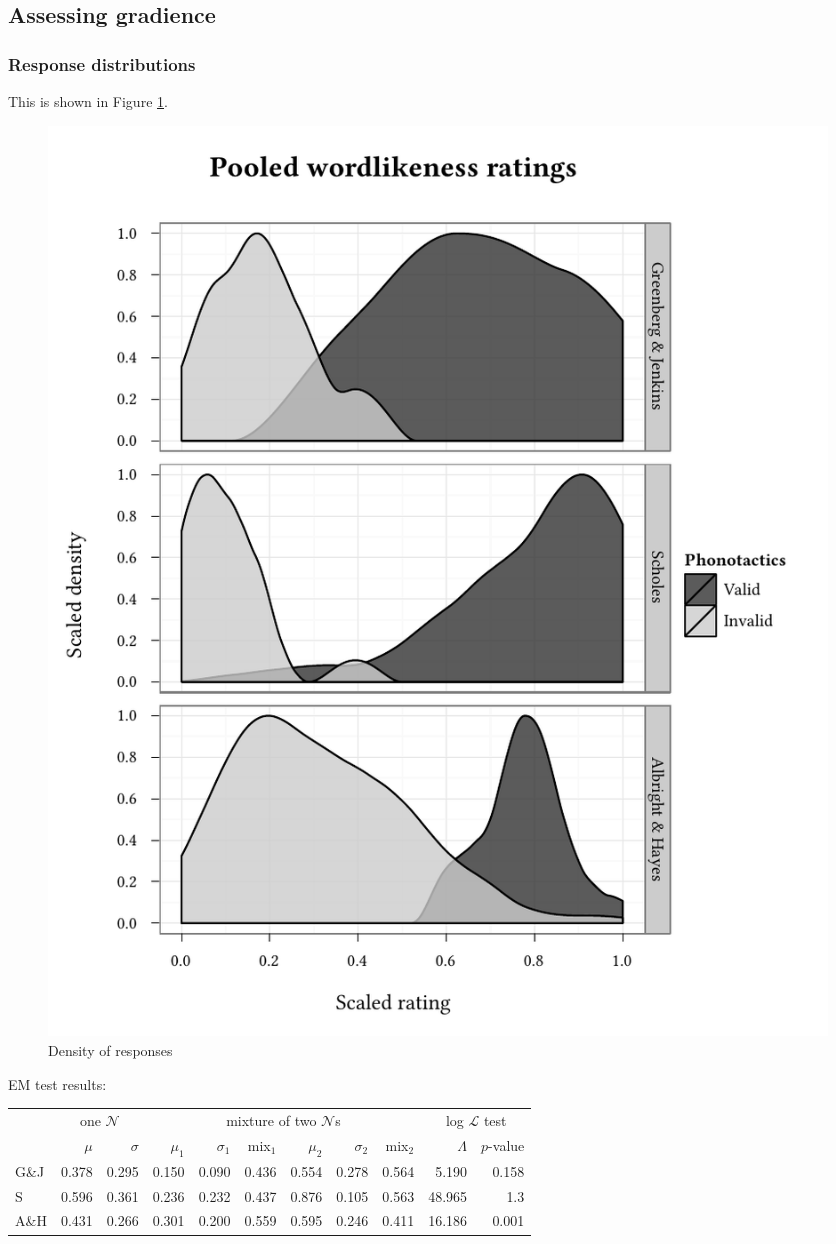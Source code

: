 \subsection{Assessing gradience}

\subsubsection{Response distributions}

This is shown in Figure \ref{density}.

\begin{figure}
\centering
\includegraphics{density.pdf}
\caption{Density of responses}
\label{density}
\end{figure}

\ex EM test results: \vspace{6pt} \\
\begin{tabular}{l | r r | r r r r r r | r r}
\toprule
     & \multicolumn{2}{c|}{one $\mathcal{N}$} & \multicolumn{6}{c|}{mixture of two $\mathcal{N}$s} & \multicolumn{2}{c}{log $\mathcal{L}$ test} \\
     & $\mu$ & $\sigma$ & $\mu_1$ & $\sigma_1$ & mix$_1$ & $\mu_2$ & $\sigma_2$ & mix$_2$ & $\Lambda$ & $p$-value  \\
\midrule
G\&J & 0.378 & 0.295    & 0.150   & 0.090      & 0.436     & 0.554   & 0.278    & 0.564     & 5.190    & 0.158   \\
S    & 0.596 & 0.361    & 0.236   & 0.232      & 0.437     & 0.876   & 0.105    & 0.563 & 48.965    & 1.3\e{-10} \\
A\&H & 0.431 & 0.266    & 0.301   & 0.200      & 0.559     & 0.595   & 0.246    & 0.411 & 16.186    & 0.001      \\
\bottomrule
\end{tabular}
\xe

